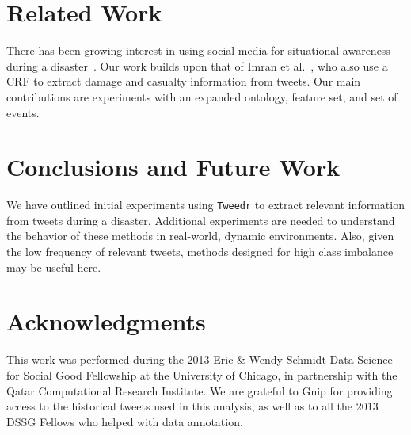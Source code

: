 \documentclass{article}
\begin{document}
\section{Related Work}
There has been growing interest in using social media for situational
awareness during a
disaster~\cite{kumar_tweettracker_2011,cheong_social_2011,mandel12demo,meier_extracting_2013,imran_practical_2013}. Our
work builds upon that of Imran et al.~\cite{imran_practical_2013}, who also
use a CRF to extract damage and casualty information from tweets. Our main
contributions are experiments with an expanded ontology, feature set, and
set of events.


\section{Conclusions and Future Work}
We have outlined initial experiments using {\tt Tweedr} to extract relevant
information from tweets during a disaster. Additional experiments are needed
to understand the behavior of these methods in real-world, dynamic
environments. Also, given the low frequency of relevant tweets, methods
designed for high class imbalance~\cite{lin_class-imbalanced_2012} may be
useful here.

\section{Acknowledgments}
This work was performed during the 2013 Eric \& Wendy Schmidt Data Science for
Social Good Fellowship at the University of Chicago, in partnership with the
Qatar Computational Research Institute. We are grateful to Gnip for providing
access to the historical tweets used in this analysis, as well as to all the
2013 DSSG Fellows who helped with data annotation.



\end{document}
